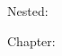 \documentclass{article}
\begin{document}
Nested: \primnested\par
Chapter: \primchapter\par

\end{document}
